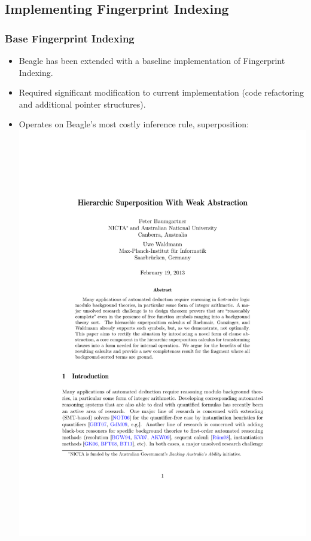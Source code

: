 \documentclass[10pt]{beamer}
\begin{document}
\begin{NoHyper}
\subsection{Implementing Fingerprint Indexing}
\begin{frame}
  \frametitle{Base Fingerprint Indexing}
  \begin{itemize}
  \item<1-> Beagle has been extended with a baseline implementation of Fingerprint
  Indexing.
  \item<2-> Required significant modification to current implementation
  (code refactoring and additional pointer structures).
  \item<3-> Operates on Beagle's most costly inference rule, superposition:\\
  \hspace{2cm}\includegraphics[page=11,scale=1,trim=9.5cm 22.7cm 5cm 5.4cm,clip]{report}


\end{itemize}
\end{frame}
\end{NoHyper}
\end{document}

